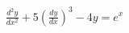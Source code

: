 \documentclass[preview]{standalone}
\begin{document}
\begin{align*}
\frac{d^2y}{dx^2} + 5 \left( \frac{dy}{dx} \right)^3 -4y = e^x
\end{align*}
\end{document}
